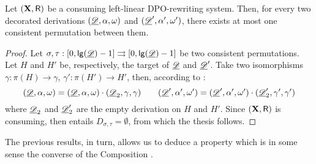 \begin{corollary}\label{cor:unique}
Let $(\textbf {\textup{X}},\mathsf{R})$ be a consuming left-linear DPO-rewriting system. Then, for every two decorated derivations $(\underline{\mathscr{D}}, \alpha, \omega)$ and $(\underline{\mathscr{D}}', \alpha', \omega')$, there exists at most one consistent permutation between them.
\end{corollary}
\begin{proof}
Let $\sigma, \tau: [0, \mathsf{lg}(\underline{\mathscr{D}})-1]\rightrightarrows [0, \mathsf{lg}(\underline{\mathscr{D}})-1]$ be two consistent permutations. Let $H$  and $H'$ be, respectively, the target of $\underline{\mathscr{D}}$ and $\underline{\mathscr{D}}'$. Take two isomorphisms $\gamma:\pi(H)\to \gamma$, $\gamma':\pi(H')\to H'$, then, according to :
\[(\underline{\mathscr{D}}, \alpha, \omega)=(\underline{\mathscr{D}}, \alpha, \omega)\cdot (\underline{\mathscr{D}}_2, \gamma, \gamma) \qquad (\underline{\mathscr{D}}', \alpha', \omega')=(\underline{\mathscr{D}}', \alpha', \omega')\cdot (\underline{\mathscr{D}}'_2, \gamma', \gamma') \]
where $\underline{\mathscr{D}}_2$ and $\underline{\mathscr{D}}'_2$ are the empty derivation on $H$ and $H'$. Since $(\textbf {\textup{X}}, \mathsf{R})$ is consuming, then  entails $D_{\sigma, \tau}=\emptyset$, from which the thesis follows.
\end{proof}

The previous results, in turn, allows us to deduce a property which is in some sense the converse of the Composition .

